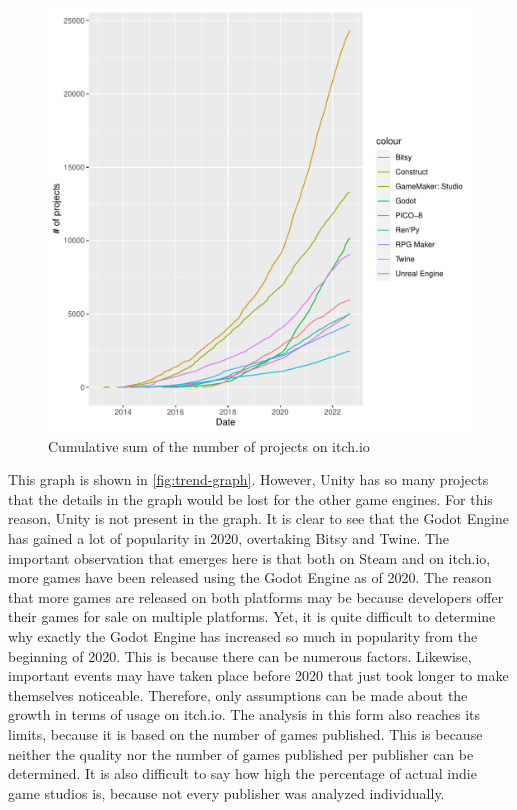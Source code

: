 \begin{figure}[h!]
    \begin{center}
        \includegraphics[width=1.1\columnwidth]{figures/trend-graph.pdf}
        \caption{\label{fig:trend-graph} Cumulative sum of the number of projects on itch.io}
    \end{center}
\end{figure}

This graph is shown in \autoref{fig:trend-graph}.
However, Unity has so many projects that the details in the graph would be lost for the other game engines.
For this reason, Unity is not present in the graph.
It is clear to see that the Godot Engine has gained a lot of popularity in 2020, overtaking Bitsy and Twine.
The important observation that emerges here is that both on Steam and on itch.io, more games have been released using the Godot Engine as of 2020.
The reason that more games are released on both platforms may be because developers offer their games for sale on multiple platforms.
Yet, it is quite difficult to determine why exactly the Godot Engine has increased so much in popularity from the beginning of 2020.
This is because there can be numerous factors.
Likewise, important events may have taken place before 2020 that just took longer to make themselves noticeable.
Therefore, only assumptions can be made about the growth in terms of usage on itch.io.
The analysis in this form also reaches its limits, because it is based on the number of games published.
This is because neither the quality nor the number of games published per publisher can be determined.
It is also difficult to say how high the percentage of actual indie game studios is, because not every publisher was analyzed individually.

